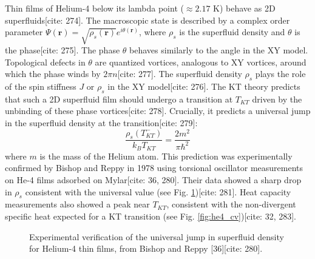 \documentclass[11pt]{article}
\begin{document}
Thin films of Helium-4 below its lambda point ($\approx 2.17$ K) behave as 2D superfluids[cite: 274]. The macroscopic state is described by a complex order parameter $\Psi(\mathbf{r}) = \sqrt{\rho_s(\mathbf{r})} e^{i\theta(\mathbf{r})}$, where $\rho_s$ is the superfluid density and $\theta$ is the phase[cite: 275]. The phase $\theta$ behaves similarly to the angle in the XY model. Topological defects in $\theta$ are quantized vortices, analogous to XY vortices, around which the phase winds by $2\pi n$[cite: 277]. The superfluid density $\rho_s$ plays the role of the spin stiffness $J$ or $\rho_s$ in the XY model[cite: 276].
The KT theory predicts that such a 2D superfluid film should undergo a transition at $T_{KT}$ driven by the unbinding of these phase vortices[cite: 278]. Crucially, it predicts a universal jump in the superfluid density at the transition[cite: 279]:
\begin{equation}
\frac{\rho_s(T_{KT}^-)}{k_B T_{KT}} = \frac{2 m^2}{\pi \hbar^2} \label{eq:sf_jump}
\end{equation}
where $m$ is the mass of the Helium atom. This prediction was experimentally confirmed by Bishop and Reppy in 1978 using torsional oscillator measurements on He-4 films adsorbed on Mylar[cite: 36, 280]. Their data showed a sharp drop in $\rho_s$ consistent with the universal value (see Fig. \ref{fig:bishop_reppy})[cite: 281]. Heat capacity measurements also showed a peak near $T_{KT}$, consistent with the non-divergent specific heat expected for a KT transition (see Fig. \ref{fig:he4_cv})[cite: 32, 283].

\begin{figure}[h!]
    \centering
    \caption{Experimental verification of the universal jump in superfluid density for Helium-4 thin films, from Bishop and Reppy [36][cite: 280].}
    \label{fig:bishop_reppy}
\end{figure}
\end{document}
